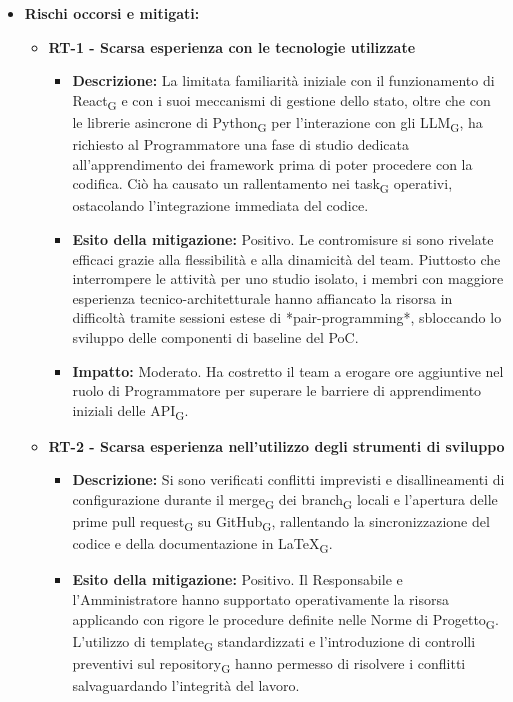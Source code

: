 \documentclass[a4paper, 10pt, colorlinks=true, linkcolor=black, urlcolor=blue, citecolor=blue, hidelinks]{article}
\begin{document}
\begin{itemize}
    \item \textbf{Rischi occorsi e mitigati:}
    \begin{itemize}
        \item \textbf{RT-1 - Scarsa esperienza con le tecnologie utilizzate}
        \begin{itemize}
            \item \textbf{Descrizione:} La limitata familiarità iniziale con il funzionamento di React\textsubscript{G} e con i suoi meccanismi di gestione dello stato, oltre che con le librerie asincrone di Python\textsubscript{G} per l'interazione con gli LLM\textsubscript{G}, ha richiesto al Programmatore una fase di studio dedicata all'apprendimento dei framework prima di poter procedere con la codifica. Ciò ha causato un rallentamento nei task\textsubscript{G} operativi, ostacolando l'integrazione immediata del codice.
            \item \textbf{Esito della mitigazione:} Positivo. Le contromisure si sono rivelate efficaci grazie alla flessibilità e alla dinamicità del team. Piuttosto che interrompere le attività per uno studio isolato, i membri con maggiore esperienza tecnico-architetturale hanno affiancato la risorsa in difficoltà tramite sessioni estese di *pair-programming*, sbloccando lo sviluppo delle componenti di baseline del PoC.
            \item \textbf{Impatto:} Moderato. Ha costretto il team a erogare ore aggiuntive nel ruolo di Programmatore per superare le barriere di apprendimento iniziali delle API\textsubscript{G}.
        \end{itemize}
        \item \textbf{RT-2 - Scarsa esperienza nell'utilizzo degli strumenti di sviluppo}
        \begin{itemize}
            \item \textbf{Descrizione:} Si sono verificati conflitti imprevisti e disallineamenti di configurazione durante il merge\textsubscript{G} dei branch\textsubscript{G} locali e l'apertura delle prime pull request\textsubscript{G} su GitHub\textsubscript{G}, rallentando la sincronizzazione del codice e della documentazione in LaTeX\textsubscript{G}.
            \item \textbf{Esito della mitigazione:} Positivo. Il Responsabile e l'Amministratore hanno supportato operativamente la risorsa applicando con rigore le procedure definite nelle Norme di Progetto\textsubscript{G}. L'utilizzo di template\textsubscript{G} standardizzati e l'introduzione di controlli preventivi sul repository\textsubscript{G} hanno permesso di risolvere i conflitti salvaguardando l'integrità del lavoro.

\end{itemize}
\end{itemize}
\end{itemize}
\end{document}
